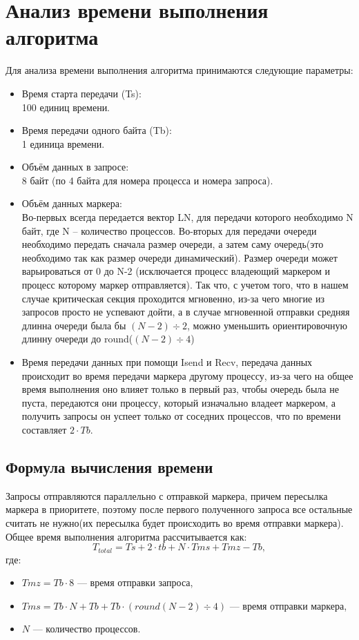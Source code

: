 \documentclass[openany, twoside, a4paper, 12pt]{extbook}
\begin{document}
\section*{Анализ времени выполнения алгоритма}
Для анализа времени выполнения алгоритма принимаются следующие параметры:
\begin{itemize}
    \item Время старта передачи (Ts):\\ 100 единиц времени.
    \item Время передачи одного байта (Tb):\\ 1 единица времени.
    \item Объём данных в запросе:\\ 8 байт (по 4 байта для номера процесса и номера запроса).
    \item Объём данных маркера: \\ Во-первых всегда передается вектор LN, для передачи которого необходимо N байт, 
	где N -- количество процессов. Во-вторых для передачи очереди необходимо передать сначала размер очереди,
	а затем саму очередь(это необходимо так как размер очереди динамический). Размер очереди может варьироваться от 
	0 до N-2 (исключается процесс владеющий маркером и процесс которому маркер отправляется). Так что, с учетом того, что 
	в нашем случае критическая секция проходится мгновенно, из-за чего многие из запросов просто не успевают дойти, 
	а в случае мгновенной отправки средняя длинна очереди была бы $(N-2)\div2$, можно уменьшить ориентировочную длинну очереди 
	до round($(N-2)\div4$)
	\item Время передачи данных при помощи Isend и Recv, передача данных происходит во время передачи маркера другому процессу,
		из-за чего на общее время выполнения оно влияет только в первый раз, чтобы очередь была не пуста, передаются они процессу,
		который изначально владеет маркером, а получить запросы он успеет только от соседних процессов, что по времени составляет $2 \cdot Tb$.
\end{itemize}

\subsection*{Формула вычисления времени}
Запросы отправляются параллельно с отправкой маркера, причем пересылка маркера в приоритете, поэтому
после первого полученного запроса все остальные считать не нужно(их пересылка будет происходить во время отправки маркера).
Общее время выполнения алгоритма рассчитывается как:
\begin{equation}
    \label{eq:total_time}
    T_{total} = Ts + 2 \cdot tb + N \cdot Tms + Tmz - Tb,
\end{equation}
где:
\begin{itemize}
    \item $Tmz = Tb \cdot 8$ — время отправки запроса,
	\item $Tms = Tb \cdot N + Tb  + Tb \cdot (round(N-2) \div 4)$ — время отправки маркера,
    \item $N$ — количество процессов.
\end{itemize}
\end{document}
